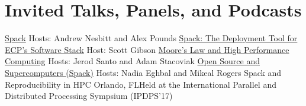 \section{Invited Talks, Panels, and Podcasts}
		{\newline \href{https://manifest.fm/11}{Spack}}
		{Hosts: Andrew Nesbitt and Alex Pounds}
        {}{}{}
		{\newline \href{https://www.exascaleproject.org/spack-the-deployment-tool-for-ecps-software-stack/}{Spack: The Deployment Tool for ECP’s Software Stack}}
		{Host: Scott Gibson}
        {}{}{}
		{\newline \href{https://changelog.com/podcast/284}{Moore's Law and High Performance Computing}}
		{Hosts: Jerod Santo and Adam Stacoviak}
        {}{}{}
		{\newline \href{https://changelog.com/rfc/13}{Open Source and Supercomputers (Spack)}}
		{Hosts: Nadia Eghbal and Mikeal Rogers}
        {}{}{}
		{\newline Spack and Reproducibility in HPC}
		{Orlando, FL}{}{Held at the International Parallel and Distributed Processing Sympsium (IPDPS'17)}
\iftoggle{grant}{
}{
	\cventry{February 26, 2016}{Tokyo Institute of Technology}
		{\newline Measuring and Analyzing Entire HPC Centers: The Sonar Project at LLNL}
		{Tokyo, Japan}{}{}
	\cventry{January 29, 2016}{University of California, Merced}
		{\newline Measuring and Analyzing Entire HPC Centers: The Sonar Project at LLNL}
		{Merced, CA}{}{}
	\cventry{March 26, 2015}{Lawrence Berkeley National Laboratory}
		{\newline Visualizing application semantics in performance tools}
		{Berkeley, CA}{}{}
}
